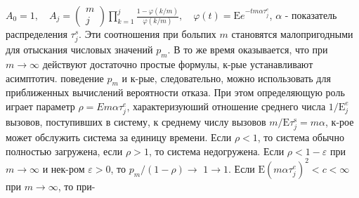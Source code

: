 \documentclass[10pt]{article}
\begin{document}
$A_{0}=1, \quad A_{j}=\left(\begin{array}{c}m \\ j\end{array}\right) \prod_{k=1}^{j} \frac{1-\varphi(k / m)}{\varphi(k / m)}, \quad \varphi(t)=\mathrm{E} e^{-t m \alpha \tau_{j}^{e}}$, $\alpha$ - показатель распределения $\tau_{j}^{s}$. Эти соотношения при больпих $m$ становятся малопригодными для отыскания числовых значений $p_{m}$. В то же время оказывается, что при $m \rightarrow \infty$ действуют достаточно простые формулы, к-рые устанавливают асимптотич. поведение $p_{m}$ и к-рые, следовательно, можно использовать для приближенных вычислений вероятности отказа. При этом определяющую роль играет параметр $\rho=E m \alpha \tau_{j}^{e}$, характеризуюший отношение среднего числа $1 / \mathrm{E}_{j}^{e}$ вызовов, поступивших в систему, к среднему числу вызовов $m / \mathrm{E} \tau_{j}^{\mathrm{s}}=m \alpha$, к-рое может обслужить система за единицу времени. Если $\rho<1$, то система обычно полностью загружена, если $\rho>1$, то система недогружена. Если $\rho<1-\varepsilon$ при $m \rightarrow \infty$ и нек-ром $\varepsilon>0$, то $p_{m} /(1-\rho) \rightarrow$ $1 \rightarrow 1$. Если $\mathrm{E}\left(m \alpha \tau_{j}^{e}\right)^{2}<c<\infty$ при $m \rightarrow \infty$, то при-
\end{document}
